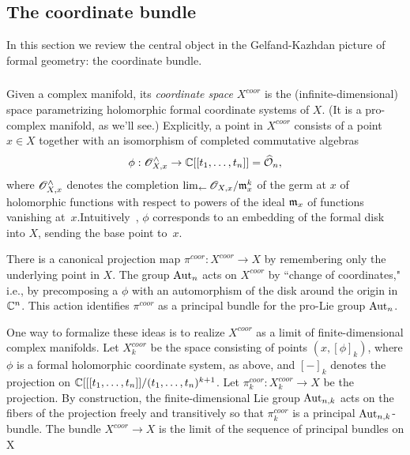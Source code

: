 \subsection{The coordinate bundle}

In this section we review the central object in the Gelfand-Kazhdan
picture of formal geometry: the coordinate bundle.


\subsubsection{}

Given a complex manifold, its {\em coordinate space} $X^{coor}$ is the (infinite-dimensional) space parametrizing holomorphic formal coordinate systems of $X$. 
(It is a pro-complex manifold, as we'll see.) 
Explicitly, a point in $X^{coor}$ consists of a point $x \in X$ 
together with an isomorphism of completed commutative algebras 
\[
\phi: \mathscr O_{X,x}^\wedge \to \mathbb C[[t_1,\ldots,t_n]] = \widehat{\mathcal O}_n,
\]
where $\mathscr O_{X,x}^\wedge$ denotes the completion $\lim_{\leftarrow} \mathscr O_{X,x}/{\mathfrak m}_x^k$ of the germ at $x$ of holomorphic functions with respect to powers of the ideal ${\mathfrak m}_x$ of functions vanishing at~$x$.\si
Intuitively, $\phi$ corresponds to an embedding of the formal disk into $X$, sending the base point to~$x$.

There is a canonical projection map $\pi^{coor} : X^{coor} \to X$ by remembering only the underlying point in $X$. 
The group ${\rm Aut}_n$ acts on $X^{coor}$ by ``change of coordinates," 
i.e., by precomposing a  $\phi$ with an automorphism of the disk around the origin in $\mathbb C^n$.
This action identifies $\pi^{coor}$ as a principal bundle for the pro-Lie group ${\rm Aut}_n$. 

One way to formalize these ideas is to realize $X^{coor}$ as a limit of finite-dimensional complex manifolds. 
Let $X_k^{coor}$ be the space consisting of points $(x, [\phi]_k)$, 
where $\phi$ is a formal holomorphic coordinate system, as above, and $[-]_k$ denotes the projection on $\mathbb C[[[t_1,\ldots,t_n]]/(t_1,\ldots,t_n)^{k+1}$. 
Let $\pi_k^{coor} : X^{coor}_k \to X$ be the projection. 
By construction, the finite-dimensional Lie group ${\rm Aut}_{n,k}$ acts on the fibers of the projection freely and transitively 
so that $\pi_k^{coor}$ is a principal ${\rm Aut}_{n,k}$-bundle. The bundle $X^{coor} \to X$ is the limit of the sequence of principal bundles on X
\ben
{}
\een

